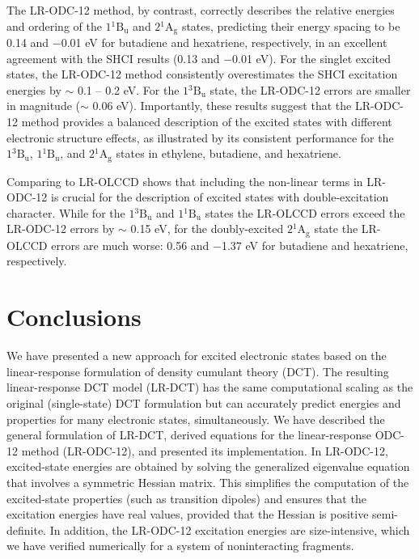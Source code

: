 The LR-ODC-12 method, by contrast, correctly describes the relative energies and ordering of the $1{}^1\mathrm{B_{u}}$ and $2{}^1\mathrm{A_{g}}$ states, predicting their energy spacing to be 0.14 and $-$0.01 eV for butadiene and hexatriene, respectively, in an excellent agreement with the SHCI results (0.13 and $-$0.01 eV). For the singlet excited states, the LR-ODC-12 method consistently overestimates the SHCI excitation energies by $\sim$ 0.1 -- 0.2 eV. For the $1{}^3\mathrm{B_{u}}$ state, the LR-ODC-12 errors are smaller in magnitude ($\sim$ 0.06 eV). Importantly, these results suggest that the LR-ODC-12 method provides a balanced description of the excited states with different electronic structure effects, as illustrated by its consistent performance for the $1{}^3\mathrm{B_{u}}$, $1{}^1\mathrm{B_{u}}$, and $2{}^1\mathrm{A_{g}}$ states in ethylene, butadiene, and hexatriene.

Comparing to LR-OLCCD shows that including the non-linear terms in LR-ODC-12 is crucial for the description of excited states with double-excitation character.
While for the $1{}^3\mathrm{B_{u}}$ and $1{}^1\mathrm{B_{u}}$ states the LR-OLCCD
errors exceed the LR-ODC-12 errors by $\sim$ 0.15 eV,
for the doubly-excited $2{}^1\mathrm{A_{g}}$ state the LR-OLCCD errors are
much worse: 0.56 and $-$1.37 eV for butadiene and hexatriene, respectively.

\section{Conclusions}
\label{sec:conclusions}
We have presented a new approach for excited electronic states based on the linear-response formulation of density cumulant theory (DCT).
The resulting linear-response DCT model (LR-DCT) has the same computational
scaling as the original (single-state) DCT formulation but can accurately
predict energies and properties for many electronic states, simultaneously.
We have described the general formulation of LR-DCT, derived equations for the linear-response ODC-12 method (LR-ODC-12), and presented its implementation. In LR-ODC-12, excited-state energies are obtained by solving the generalized eigenvalue equation that involves a symmetric Hessian matrix.
This simplifies the computation of the excited-state properties (such as
transition dipoles) and ensures that the excitation energies have real values,
provided that the Hessian is positive semi-definite.
In addition, the LR-ODC-12 excitation energies are size-intensive, which we have
verified numerically for a system of noninteracting fragments. 

